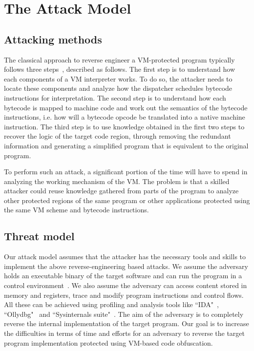 \section{The Attack Model}\label{sec:attack}
\subsection{Attacking methods}
The classical approach to reverse engineer a VM-protected program typically
follows three steps~\cite{10falliere2009inside,17rolles2009unpacking}, described as follows.
The first step is to understand how each components of a VM interpreter works.
To do so, the attacker needs to locate
these components and analyze how the dispatcher schedules bytecode instructions for interpretation.
The second step is to understand how each bytecode is mapped to machine code
and work out the semantics of the bytecode instructions, i.e. how will a bytecode opcode 
be translated into a native machine instruction.
The third step is to use knowledge obtained in the first two steps to recover the
logic of the target code region, through removing the redundant information
and generating a simplified program that is equivalent to the original program.


To perform such an attack, a significant portion of the time will have to spend in analyzing the working
mechanism of the VM.
The problem is that a skilled attacker could  reuse knowledge
gathered from parts of the program to analyze other protected regions of
the same program or other applications protected using the same VM scheme and bytecode instructions.

\subsection{Threat model}
Our attack model assumes that the attacker has the necessary tools and skills to implement the above reverse-engineering based attacks.
We assume the adversary holds an executable binary of the
target software and can run the program in a control
environment~\cite{11collberg2002watermarking}. We also assume the adversary
can access content stored in memory and registers, trace and modify program
instructions and control flows.
All these can be achieved using profiling and analysis tools like ``IDA"~\cite{14Idapro}, ``Ollydbg"~\cite{15Ollydbg} and
``Sysinternals suite"~\cite{16Sysinternalssuite}. The aim of the adversary is
to completely reverse the internal implementation of the target program.
Our goal is to increase the difficulties in terms of time and efforts for an adversary to
reverse the target program implementation protected using VM-based code obfuscation. 